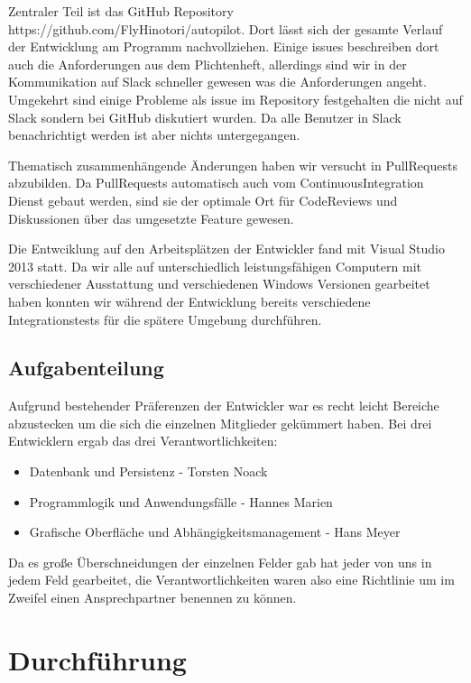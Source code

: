\documentclass[12pt]{article}
\begin{document}
Zentraler Teil ist das GitHub Repository https://github.com/FlyHinotori/autopilot. Dort lässt sich der gesamte Verlauf der Entwicklung am Programm nachvollziehen. Einige issues beschreiben dort auch die Anforderungen aus dem Plichtenheft, allerdings sind wir in der Kommunikation auf Slack schneller gewesen was die Anforderungen angeht. Umgekehrt sind einige Probleme als issue im Repository festgehalten die nicht auf Slack sondern bei GitHub diskutiert wurden. Da alle Benutzer in Slack benachrichtigt werden ist aber nichts untergegangen.

Thematisch zusammenhängende Änderungen haben wir versucht in PullRequests abzubilden. Da PullRequests automatisch auch vom ContinuousIntegration Dienst gebaut werden, sind sie der optimale Ort für CodeReviews und Diskussionen über das umgesetzte Feature gewesen.

Die Entwciklung auf den Arbeitsplätzen der Entwickler fand mit Visual Studio 2013 statt. Da wir alle auf unterschiedlich leistungsfähigen Computern mit verschiedener Ausstattung und verschiedenen Windows Versionen gearbeitet haben konnten wir während der Entwicklung bereits verschiedene Integrationstests für die spätere Umgebung durchführen.

\subsection{Aufgabenteilung}

Aufgrund bestehender Präferenzen der Entwickler war es recht leicht Bereiche abzustecken um die sich die einzelnen Mitglieder gekümmert haben. Bei drei Entwicklern ergab das drei Verantwortlichkeiten: 

\begin{itemize}
  \item Datenbank und Persistenz - Torsten Noack
  \item Programmlogik und Anwendungsfälle - Hannes Marien
  \item Grafische Oberfläche und Abhängigkeitsmanagement - Hans Meyer
\end{itemize}

Da es große Überschneidungen der einzelnen Felder gab hat jeder von uns in jedem Feld gearbeitet, die Verantwortlichkeiten waren also eine Richtlinie um im Zweifel einen Ansprechpartner benennen zu können.

\newpage
\section{Durchführung}
\end{document}
